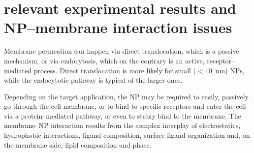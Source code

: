 

\section{relevant experimental results and NP--membrane interaction issues}
Membrane permeation can happen via direct translocation, which is a passive mechanism, or via endocytosis, which on the contrary is an active, receptor--mediated process. Direct translocation is more likely for small ($< 10$~nm) \acp{NP}, while the endocytotic pathway is typical of the larger ones.

Depending on the target application, the \ac{NP} may be required to easily, passively go through the cell membrane, or to bind to specific receptors and enter the cell via a protein--mediated pathway, or even to stably bind to the membrane. The membrane--\ac{NP} interaction results from the complex interplay of electrostatics, hydrophobic interactions, ligand composition, surface ligand organization and, on the membrane side, lipid composition and phase.

